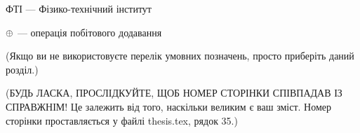 ФТІ --- Фізико-технічний інститут

$\oplus$ --- операція побітового додавання  %


(Якщо ви не використовуєте перелік умовних позначень, просто приберіть 
даний розділ.)

(БУДЬ ЛАСКА, ПРОСЛІДКУЙТЕ, ЩОБ НОМЕР СТОРІНКИ СПІВПАДАВ ІЗ СПРАВЖНІМ! Це залежить від того, наскільки великим є ваш зміст.
Номер сторінки проставляється у файлі thesis.tex, рядок 35.)